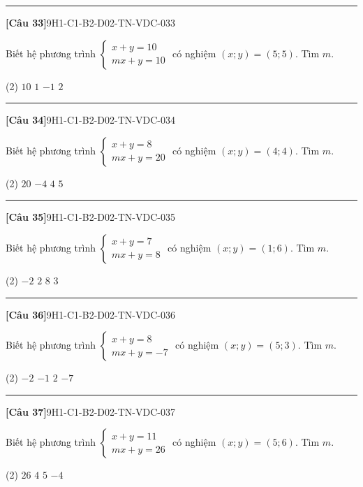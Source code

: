 \documentclass[12pt,a4paper]{article}
\newif\ifloigiai
\newenvironment{cauhoi}[2]{%
  \par\medskip\noindent\rule{\textwidth}{0.4pt}\par\nopagebreak
  \noindent\textbf{[#1]}\hfill{\scriptsize\ttfamily #2}\par\nopagebreak\smallskip}{\par}
\newcommand{\dapan}[1]{\ifloigiai\par\smallskip\noindent\textit{Đáp án:} \textbf{#1}\par\fi}
\begin{document}
\begin{cauhoi}{Câu 33}{9H1-C1-B2-D02-TN-VDC-033}
Biết hệ phương trình $\begin{cases}x+y=10\\ mx+y=10\end{cases}$ có nghiệm $(x;y)=(5;5)$. Tìm $m$.
\begin{tasks}(2)
\task $10$
\task $1$
\task $-1$
\task $2$
\end{tasks}
\dapan{B}
\end{cauhoi}
\begin{cauhoi}{Câu 34}{9H1-C1-B2-D02-TN-VDC-034}
Biết hệ phương trình $\begin{cases}x+y=8\\ mx+y=20\end{cases}$ có nghiệm $(x;y)=(4;4)$. Tìm $m$.
\begin{tasks}(2)
\task $20$
\task $-4$
\task $4$
\task $5$
\end{tasks}
\dapan{C}
\end{cauhoi}
\begin{cauhoi}{Câu 35}{9H1-C1-B2-D02-TN-VDC-035}
Biết hệ phương trình $\begin{cases}x+y=7\\ mx+y=8\end{cases}$ có nghiệm $(x;y)=(1;6)$. Tìm $m$.
\begin{tasks}(2)
\task $-2$
\task $2$
\task $8$
\task $3$
\end{tasks}
\dapan{B}
\end{cauhoi}
\begin{cauhoi}{Câu 36}{9H1-C1-B2-D02-TN-VDC-036}
Biết hệ phương trình $\begin{cases}x+y=8\\ mx+y=-7\end{cases}$ có nghiệm $(x;y)=(5;3)$. Tìm $m$.
\begin{tasks}(2)
\task $-2$
\task $-1$
\task $2$
\task $-7$
\end{tasks}
\dapan{A}
\end{cauhoi}
\begin{cauhoi}{Câu 37}{9H1-C1-B2-D02-TN-VDC-037}
Biết hệ phương trình $\begin{cases}x+y=11\\ mx+y=26\end{cases}$ có nghiệm $(x;y)=(5;6)$. Tìm $m$.
\begin{tasks}(2)
\task $26$
\task $4$
\task $5$
\task $-4$
\end{tasks}
\dapan{B}
\end{cauhoi}
\end{document}
